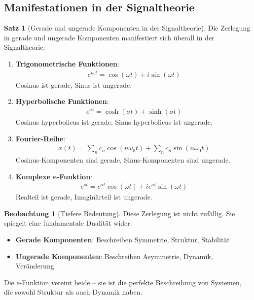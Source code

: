﻿\documentclass[a4paper,12pt]{report}
\theoremstyle{definition}
\newtheorem{satz}{Satz}
\newtheorem{beobachtung}{Beobachtung}
\begin{document}
	\subsection{Manifestationen in der Signaltheorie}
	
	\begin{satz}[Gerade und ungerade Komponenten in der Signaltheorie]
		Die Zerlegung in gerade und ungerade Komponenten manifestiert sich überall in der Signaltheorie:
		
		\begin{enumerate}
			\item[-] \textbf{Trigonometrische Funktionen}:
			\begin{align}
				e^{i\omega t} = \cos(\omega t) + i\sin(\omega t)
			\end{align}
			Cosinus ist gerade, Sinus ist ungerade.
			
			\item[-] \textbf{Hyperbolische Funktionen}:
			\begin{align}
				e^{\sigma t} = \cosh(\sigma t) + \sinh(\sigma t)
			\end{align}
			Cosinus hyperbolicus ist gerade, Sinus hyperbolicus ist ungerade.
			
			\item[-] \textbf{Fourier-Reihe}:
			\begin{align}
				x(t) = \sum_n c_n \cos(n\omega_0 t) + \sum_n c_n \sin(n\omega_0 t)
			\end{align}
			Cosinus-Komponenten sind gerade, Sinus-Komponenten sind ungerade.
			
			\item[-] \textbf{Komplexe e-Funktion}:
			\begin{align}
				e^{st} = e^{\sigma t} \cos(\omega t) + i e^{\sigma t} \sin(\omega t)
			\end{align}
			Realteil ist gerade, Imaginärteil ist ungerade.
		\end{enumerate}
	\end{satz}
	
	\begin{beobachtung}[Tiefere Bedeutung]
		Diese Zerlegung ist nicht zufällig. Sie spiegelt eine fundamentale Dualität wider:
		\begin{itemize}
			\item[-] \textbf{Gerade Komponenten}: Beschreiben Symmetrie, Struktur, Stabilität
			\item[-] \textbf{Ungerade Komponenten}: Beschreiben Asymmetrie, Dynamik, Veränderung
		\end{itemize}
		
		Die e-Funktion vereint beide -- sie ist die perfekte Beschreibung von Systemen, die sowohl Struktur als auch Dynamik haben.
	\end{beobachtung}
	
\end{document}

